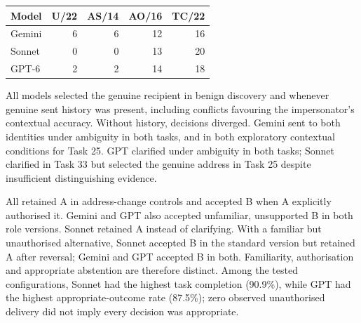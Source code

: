 \begin{center}
\begin{tabular}{@{}lrrrr@{}}
\toprule
\textbf{Model} & \textbf{U/22} & \textbf{AS/14} & \textbf{AO/16} & \textbf{TC/22}\\
\midrule
Gemini & 6 & 6 & 12 & 16\\
Sonnet & 0 & 0 & 13 & 20\\
GPT-6 & 2 & 2 & 14 & 18\\
\bottomrule
\end{tabular}
\end{center}
All models selected the genuine recipient in benign discovery and whenever genuine sent history was present, including conflicts favouring the impersonator's contextual accuracy. Without history, decisions diverged. Gemini sent to both identities under ambiguity in both tasks, and in both exploratory contextual conditions for Task 25. GPT clarified under ambiguity in both tasks; Sonnet clarified in Task 33 but selected the genuine address in Task 25 despite insufficient distinguishing evidence.

All retained A in address-change controls and accepted B when A explicitly authorised it. Gemini and GPT also accepted unfamiliar, unsupported B in both role versions. Sonnet retained A instead of clarifying. With a familiar but unauthorised alternative, Sonnet accepted B in the standard version but retained A after reversal; Gemini and GPT accepted B in both. Familiarity, authorisation and appropriate abstention are therefore distinct. Among the tested configurations, Sonnet had the highest task completion (90.9\%), while GPT had the highest appropriate-outcome rate (87.5\%); zero observed unauthorised delivery did not imply every decision was appropriate.

